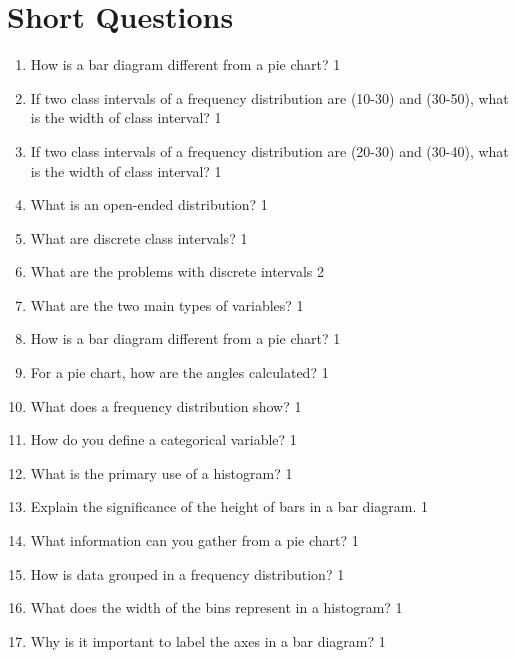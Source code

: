 \documentclass[a4paper,oneside]{book}
\begin{document}
\section{Short Questions}

\begin{enumerate}

\item How is a bar diagram different from a pie chart? \hfill 1

 \item If two class intervals of a frequency distribution are (10-30) and 
 (30-50), what is the width of class interval? \hfill 1
  \item If two class intervals of a frequency distribution are (20-30) and 
 (30-40), what is the width of class interval? \hfill 1
\item What is an open-ended distribution? \hfill 1
  \item   What are discrete class intervals? \hfill 1
    \item 	What are the problems with discrete intervals \hfill 2
    \item What are the two main types of variables? \hfill 1

\item How is a bar diagram different from a pie chart? \hfill 1

  \item For a pie chart, how are the angles calculated? \hfill 1

\item What does a frequency distribution show? \hfill 1

\item How do you define a categorical variable? \hfill 1

\item What is the primary use of a histogram? \hfill 1

\item Explain the significance of the height of bars in a bar diagram. \hfill 1

\item What information can you gather from a pie chart? \hfill 1

\item How is data grouped in a frequency distribution? \hfill 1

\item What does the width of the bins represent in a histogram? \hfill 1

\item Why is it important to label the axes in a bar diagram? \hfill 1


\end{enumerate}
\end{document}
